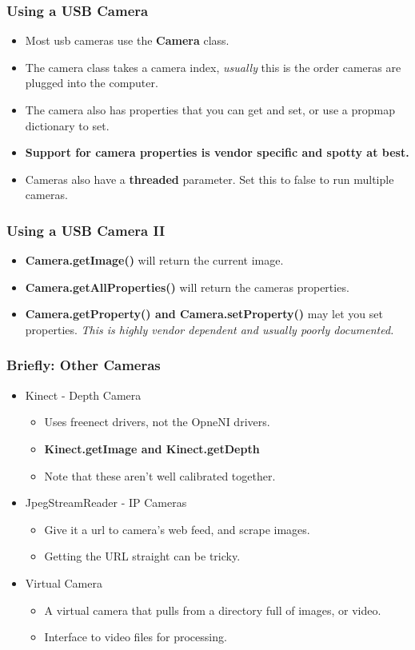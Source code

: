 \documentclass{beamer}
\begin{document}
\begin{frame}
\frametitle{Using a USB Camera}
\begin{itemize}
\item Most usb cameras use the \textbf{Camera} class. 
\item The camera class takes a camera index, \emph{usually} this is the
   order cameras are plugged into the computer.
\item The camera also has properties that you can get and set, or use a propmap dictionary to set. 
 \item \textbf{Support for camera properties is vendor specific and spotty at
   best.} 
 \item Cameras also have a \textbf{threaded} parameter. Set this to false
 to run multiple cameras. 
\end{itemize}
\end{frame}
\begin{frame}
\frametitle{Using a USB Camera II}
\begin{itemize}
\item \textbf{Camera.getImage()} will return the current image. 
\item \textbf{Camera.getAllProperties()} will return the cameras properties.
\item \textbf{Camera.getProperty() and Camera.setProperty()} may let
  you set properties. \emph{This is highly vendor dependent and usually poorly documented.}
\end{itemize}
\end{frame}
\begin{frame}
\frametitle{Briefly: Other Cameras}
\begin{itemize}
\item Kinect - Depth Camera
\begin{itemize}
\item Uses freenect drivers, not the OpneNI drivers.
\item \textbf{Kinect.getImage and Kinect.getDepth }
\item Note that these aren't well calibrated together.
\end{itemize}
\item JpegStreamReader - IP Cameras
\begin{itemize}
\item Give it a url to camera's web feed, and scrape images.
\item Getting the URL straight can be tricky. 
\end{itemize}
\item Virtual Camera
\begin{itemize}
\item A virtual camera that pulls from a directory full of images, or video.
\item Interface to video files for processing.
\end{itemize}
\end{itemize}
\end{frame}
\end{document}
